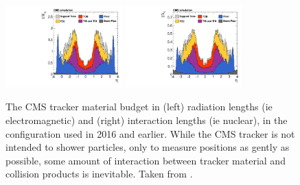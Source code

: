   \begin{figure}[h!]
    \centering
    \includegraphics[width=0.4\textwidth]{figures/MaterialBudget_RadLengths.pdf}
    \includegraphics[width=0.4\textwidth]{figures/MaterialBudget_InteractionLengths.pdf}
    \caption[Tracker material budget.]{
      The CMS tracker material budget in (left) radiation lengths (ie electromagnetic) and (right) interaction lengths (ie nuclear), in the configuration used in 2016 and earlier. 
      While the CMS tracker is not intended to shower particles, only to measure positions as gently as possible, some amount of interaction between tracker material and collision products is inevitable.
      Taken from \cite{cmstracking}.}
    \label{fig:trackerbudget}
  \end{figure}  

